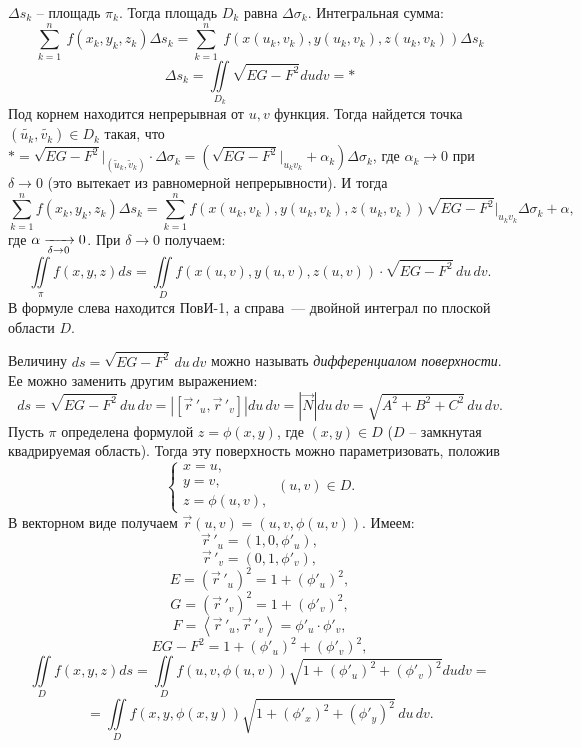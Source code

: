 \documentclass[../../main.tex]{subfiles}
\begin{document}
	$\Delta s_k$ \--- площадь $\pi_k$. Тогда площадь $D_k$ равна $\Delta\sigma
	_k$. Интегральная сумма:
	\[\sum^{n}_{k=1} \ f(x_k, y_k, z_k)\Delta s_k = \sum^{n}_{k=1} \ f(x(u_k, 
	v_k),
	 y(u_k, v_k), z(u_k, v_k))\Delta s_k \]
	\[\Delta s_k = \iint \limits_{D_k}\sqrt{EG - F^2}dudv = *  \]
	Под корнем находится непрерывная от $u, v$ функция. Тогда найдется точка 
	$(\widetilde{u_k},
	 \widetilde{v_k}) \in D_k$ такая, что $* = \sqrt{EG -F^2} 
	 \big|_{(\widetilde{u}_k,
	  \widetilde{v}_k)} \cdot \Delta \sigma_k = (\sqrt{EG - F^2} \big|_{u_kv_k} 
	  +\alpha_k)
   \Delta \sigma_k$, где $\alpha_k \to 0$ при $\delta \to 0$ (это вытекает из 
   равномерной
    непрерывности). И тогда 
	\[ \sum_{k=1}^{n} f(x_k,y_k, z_k) \Delta s_k = \sum_{k=1}^{n} f(x(u_k, v_k),
	 y(u_k, v_k), z(u_k, v_k)) \sqrt{EG - F^2}\big|_{u_k v_k} \Delta \sigma_k
	  +\alpha,\]
	где $\alpha \xrightarrow[\delta \to 0]{} 0$. При $\delta \to 0$ получаем:
	\begin{equation}
	\label{lec23-1}
	\boxed{
	\iint \limits_{\pi} f(x,y,z)ds = \iint \limits_Df(x(u,v), y(u,v),z(u,v)) 
	\cdot \sqrt{EG - F^2}\, du\, dv.
	}
	\end{equation}
    В формуле слева находится ПовИ-1, а справа~--- двойной интеграл по плоской 
    области
     $D$.
    \begin{rem}
    Величину $ds = \sqrt{EG - F^2}\, du\, dv$ можно называть
     \emph{дифференциалом поверхности}. Ее можно заменить другим выражением:
    \[ds = \sqrt{EG - F^2}\,du\,dv = |[\vec r\,'_u, \vec r\,'_v]| 
    du\, dv =
     |\vec{N}| du\, dv = \sqrt{A^2 + B^2 + C^2}\, du\, dv. \]
    Пусть $\pi$ определена формулой $z= \phi(x,y)$, где $(x,y) \in D$ ($D$ \---
     замкнутая квадрируемая область). Тогда эту поверхность можно 
     параметризовать, положив
      \[\begin{cases} x=u, \\ y = v, \\ z= \phi(u,v),
        \end{cases}
        \ (u, v) \in D.\] В векторном виде получаем
      $\vec{r}(u,v) =
       (u, v, \phi(u,v))$. Имеем:
    \[\vec r\,'_u = (1, 0, \phi'_u),\] 
    \[\vec r\,'_v = (0, 1, \phi'_v),\]
	\[E =(\vec r\,'_u)^2 = 1 + (\phi'_u)^2,\]
	\[G =(\vec r\,'_v)^2 = 1 + (\phi'_v)^2,\]
	\[F = \left<\vec r\,'_u, \vec r\,'_v\right> = \phi'_u \cdot 
	\phi'_v,\]
	\[EG - F^2 = 1 + (\phi'_u)^2 + (\phi'_v)^2, \]
	\[\iint \limits_D f(x, y, z)ds = \iint \limits_D f(u,v, \phi(u,v)) \sqrt{1 +
		 (\phi'_u)^2 + (\phi'_v)^2} dudv = \] \[= \iint \limits_D f(x,y, \phi(x,y))
	  \sqrt{1 + (\phi'_x)^2 + (\phi'_y)^2}\, du\,dv. \]
	\end{rem}
\end{document}
